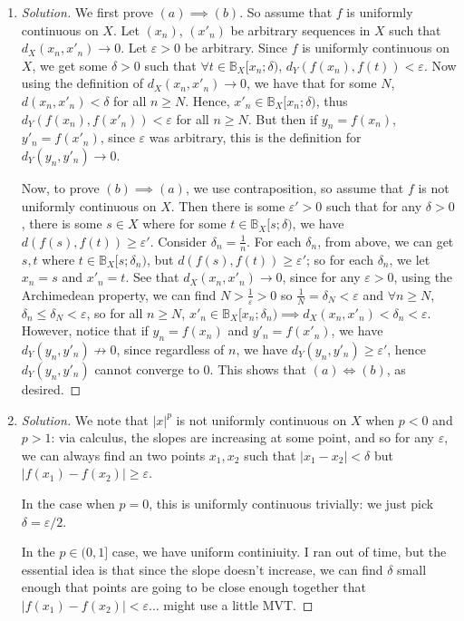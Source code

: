\documentclass{article}
\newcommand{\ep}{{\varepsilon}}
\begin{document}
\begin{enumerate}
	\item \begin{proof}[Solution]\let\qed\relax
		We first prove $(a) \implies (b)$.
		So assume that $f$ is uniformly continuous on $X$.
		Let $(x_n)$, $(x'_n)$ be arbitrary sequences in $X$
		such that $d_X(x_n,x'_n) \to 0$.
		Let $\ep > 0$ be arbitrary.
		Since $f$ is uniformly continuous on $X$,
		we get some $\delta > 0$ such that
		$\forall t \in \mathbb{B}_X[x_n;\delta)$,
		$d_Y(f(x_n),f(t)) < \ep$.
		Now using the definition of $d_X(x_n,x'_n) \to 0$,
		we have that for some $N$, $d(x_n,x'_n) < \delta$
		for all $n \geq N$.
		Hence, $x'_n \in \mathbb{B}_X[x_n;\delta)$,
		thus $d_Y(f(x_n),f(x'_n)) < \ep$ for all $n \geq N$.
		But then if $y_n = f(x_n)$, $y'_n = f(x'_n)$,
		since $\ep$ was arbitrary,
		this is the definition for $d_Y(y_n,y'_n) \to 0$.

		Now, to prove $(b) \implies (a)$,
		we use contraposition,
		so assume that $f$ is not uniformly continuous on $X$.
		Then there is some $\ep' > 0$ such that for any $\delta > 0$,
		there is some $s \in X$ where for some $t \in \mathbb{B}_X[s;\delta)$,
		we have $d(f(s),f(t)) \geq \ep'$.
		Consider $\delta_n = \frac{1}{n}$.
		For each $\delta_n$, from above, we can get $s,t$ where
		$t \in \mathbb{B}_X[s;\delta_n)$, but $d(f(s),f(t))\geq \ep'$;
		so for each $\delta_n$, we let $x_n = s$ and $x'_n = t$.
		See that $d_X(x_n,x'_n) \to 0$,
		since for any $\ep > 0$, using the Archimedean property,
		we can find $N > \frac{1}{\ep} > 0$ so $\frac{1}{N} = \delta_N < \ep$
		and $\forall n \geq N$, $\delta_n \leq \delta_N < \ep$,
		so for all $n \geq N$, $x'_n \in \mathbb{B}_X[x_n;\delta_n)
		\implies d_X(x_n,x'_n) < \delta_n < \ep$.
		However, notice that if $y_n = f(x_n)$ and $y'_n = f(x'_n)$,
		we have $d_Y(y_n,y'_n) \not\to 0$,
		since regardless of $n$, we have $d_Y(y_n,y'_n) \geq \ep'$,
		hence $d_Y(y_n,y'_n)$ cannot converge to $0$.
		This shows that $(a) \iff (b)$, as desired.
	\end{proof}
	\item \begin{proof}[Solution]\let\qed\relax
		We note that $|x|^p$ is not uniformly continuous on $X$
		when $p < 0$ and $p >1$:
		via calculus, the slopes are increasing at some point,
		and so for any $\ep$, we can always find an two points $x_1,x_2$
		such that $|x_1-x_2| < \delta$ but $|f(x_1) - f(x_2)| \geq \ep$.

		In the case when $p = 0$, this is uniformly continuous trivially:
		we just pick $\delta = \ep/2$.

		In the $p \in (0,1]$ case, we have uniform continiuity.
		I ran out of time, but the essential idea
		is that since the slope doesn't increase,
		we can find $\delta$ small enough that points are going to be
		close enough together that $|f(x_1) - f(x_2)| < \ep$...
		might use a little MVT.
	\end{proof}
\end{enumerate}
\clearpage
~\clearpage
\end{document}
